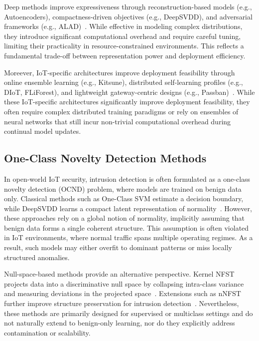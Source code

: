 \documentclass[final,twocolumn,10pt]{elsarticle}
\begin{document}
Deep methods improve expressiveness through reconstruction-based models (e.g., Autoencoders), compactness-driven objectives (e.g., DeepSVDD), and adversarial frameworks (e.g., ALAD)~\cite{Autoencoder,ALAD}. While effective in modeling complex distributions, they introduce significant computational overhead and require careful tuning, limiting their practicality in resource-constrained environments. This reflects a fundamental trade-off between representation power and deployment efficiency.

Moreever, IoT-specific architectures improve deployment feasibility through online ensemble learning (e.g., Kitsune), distributed self-learning profiles (e.g., DIoT, FLiForest), and lightweight gateway-centric designs (e.g., Passban)~\cite{mirsky2018kitsune, nguyen2019diot, xiang2026federated, 8976157}. While these IoT-specific architectures significantly improve deployment feasibility, they often require complex distributed training paradigms or rely on ensembles of neural networks that still incur non-trivial computational overhead during continual model updates.

\subsection{One-Class Novelty Detection Methods}

In open-world IoT security, intrusion detection is often formulated as a one-class novelty detection (OCND) problem, where models are trained on benign data only. Classical methods such as One-Class SVM estimate a decision boundary, while DeepSVDD learns a compact latent representation of normality~\cite{shin2005one,DeepSVDD}.
However, these approaches rely on a global notion of normality, implicitly assuming that benign data forms a single coherent structure. This assumption is often violated in IoT environments, where normal traffic spans multiple operating regimes. As a result, such models may either overfit to dominant patterns or miss locally structured anomalies.

Null-space-based methods provide an alternative perspective. Kernel NFST projects data into a discriminative null space by collapsing intra-class variance and measuring deviations in the projected space~\cite{bodesheim2013kernel}. Extensions such as nNFST further improve structure preservation for intrusion detection~\cite{nguyen2025nnfst}. Nevertheless, these methods are primarily designed for supervised or multiclass settings and do not naturally extend to benign-only learning, nor do they explicitly address contamination or scalability.
\end{document}
